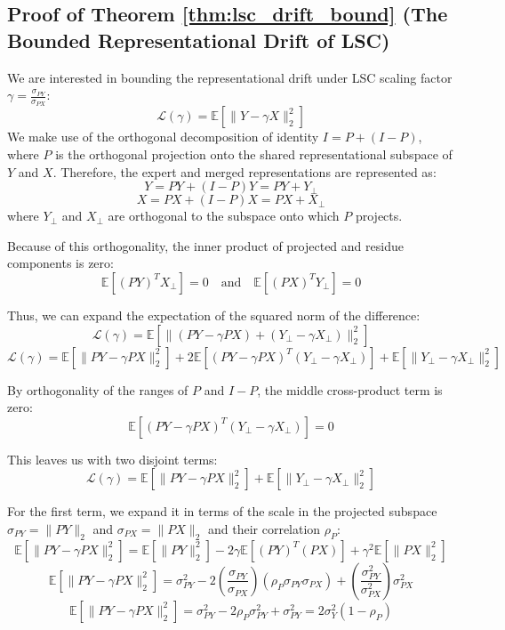 \documentclass{article}
\theoremstyle{plain}
\theoremstyle{definition}
\theoremstyle{remark}
\begin{document}
\subsection{Proof of Theorem \ref{thm:lsc_drift_bound} (The Bounded Representational Drift of LSC)}
We are interested in bounding the representational drift under LSC scaling factor $\gamma = \frac{\sigma_{PY}}{\sigma_{PX}}$:
$$\mathcal{L}(\gamma) = \mathbb{E}[\| Y - \gamma X \|_2^2]$$
We make use of the orthogonal decomposition of identity $I = P + (I - P)$, where $P$ is the orthogonal projection onto the shared representational subspace of $Y$ and $X$.
Therefore, the expert and merged representations are represented as:
$$Y = P Y + (I - P)Y = P Y + Y_\perp$$
$$X = P X + (I - P)X = P X + X_\perp$$
where $Y_\perp$ and $X_\perp$ are orthogonal to the subspace onto which $P$ projects.

Because of this orthogonality, the inner product of projected and residue components is zero:
$$\mathbb{E}[(PY)^T X_\perp] = 0 \quad \text{and} \quad \mathbb{E}[(PX)^T Y_\perp] = 0$$

Thus, we can expand the expectation of the squared norm of the difference:
$$\mathcal{L}(\gamma) = \mathbb{E}\left[ \| (P Y - \gamma P X) + (Y_\perp - \gamma X_\perp) \|_2^2 \right]$$
$$\mathcal{L}(\gamma) = \mathbb{E}\left[ \| PY - \gamma PX \|_2^2 \right] + 2 \mathbb{E}\left[ (PY - \gamma PX)^T (Y_\perp - \gamma X_\perp) \right] + \mathbb{E}\left[ \| Y_\perp - \gamma X_\perp \|_2^2 \right]$$

By orthogonality of the ranges of $P$ and $I - P$, the middle cross-product term is zero:
$$\mathbb{E}\left[ (PY - \gamma PX)^T (Y_\perp - \gamma X_\perp) \right] = 0$$

This leaves us with two disjoint terms:
$$\mathcal{L}(\gamma) = \mathbb{E}\left[ \| PY - \gamma PX \|_2^2 \right] + \mathbb{E}\left[ \| Y_\perp - \gamma X_\perp \|_2^2 \right]$$

For the first term, we expand it in terms of the scale in the projected subspace $\sigma_{PY} = \|PY\|_2$ and $\sigma_{PX} = \|PX\|_2$ and their correlation $\rho_P$:
$$\mathbb{E}\left[ \| PY - \gamma PX \|_2^2 \right] = \mathbb{E}[\|PY\|_2^2] - 2\gamma \mathbb{E}[(PY)^T (PX)] + \gamma^2 \mathbb{E}[\|PX\|_2^2]$$
$$\mathbb{E}\left[ \| PY - \gamma PX \|_2^2 \right] = \sigma_{PY}^2 - 2 \left(\frac{\sigma_{PY}}{\sigma_{PX}}\right) (\rho_P \sigma_{PY} \sigma_{PX}) + \left(\frac{\sigma_{PY}^2}{\sigma_{PX}^2}\right) \sigma_{PX}^2$$
$$\mathbb{E}\left[ \| PY - \gamma PX \|_2^2 \right] = \sigma_{PY}^2 - 2 \rho_P \sigma_{PY}^2 + \sigma_{PY}^2 = 2 \sigma_Y^2 (1 - \rho_P)$$
\end{document}
